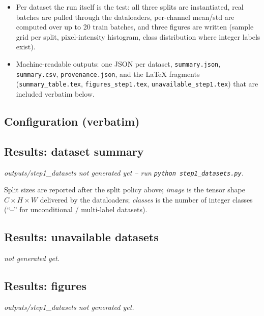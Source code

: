 \documentclass[11pt]{article}
\begin{document}
\begin{itemize}
        natural-image datasets additionally get
        \texttt{Resize}+\texttt{CenterCrop} to the per-dataset
        \texttt{image\_size} in the config. No normalization or dequantization
        is baked in here -- for flow training those belong to the model step
        so the data step stays lossless.
  \item Per dataset the run itself is the test: all three splits are
        instantiated, real batches are pulled through the dataloaders,
        per-channel mean/std are computed over up to 20 train batches, and
        three figures are written (sample grid per split, pixel-intensity
        histogram, class distribution where integer labels exist).
  \item Machine-readable outputs: one JSON per dataset,
        \texttt{summary.json}, \texttt{summary.csv},
        \texttt{provenance.json}, and the \LaTeX{} fragments
        (\texttt{summary\_table.tex}, \texttt{figures\_step1.tex},
        \texttt{unavailable\_step1.tex}) that are included verbatim below.
\end{itemize}

\subsection{Configuration (verbatim)}
{\small}

\subsection{Results: dataset summary}
\begin{center}
  {\emph{outputs/step1\_datasets not generated yet -- run
   \texttt{python step1\_datasets.py}.}}
\end{center}
Split sizes are reported after the split policy above; \emph{image} is the
tensor shape $C\times H\times W$ delivered by the dataloaders; \emph{classes}
is the number of integer classes (``--'' for unconditional / multi-label
datasets).

\subsection{Results: unavailable datasets}
\label{sec:unavailable}
  {\emph{not generated yet.}}

\subsection{Results: figures}
  {\emph{outputs/step1\_datasets not generated yet.}}
\clearpage
\end{document}
